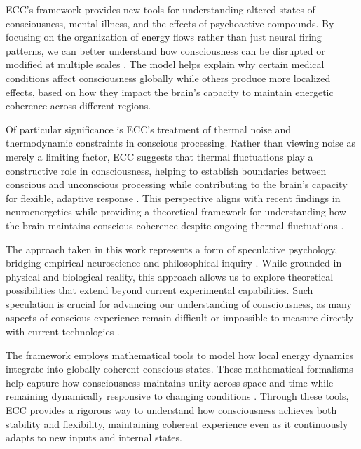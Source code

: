 ECC's framework provides new tools for understanding altered states of consciousness, mental illness, and the effects of psychoactive compounds. By focusing on the organization of energy flows rather than just neural firing patterns, we can better understand how consciousness can be disrupted or modified at multiple scales \cite{varela1991embodied}. The model helps explain why certain medical conditions affect consciousness globally while others produce more localized effects, based on how they impact the brain's capacity to maintain energetic coherence across different regions.

Of particular significance is ECC's treatment of thermal noise and thermodynamic constraints in conscious processing. Rather than viewing noise as merely a limiting factor, ECC suggests that thermal fluctuations play a constructive role in consciousness, helping to establish boundaries between conscious and unconscious processing while contributing to the brain's capacity for flexible, adaptive response \cite{prigogine2018order}. This perspective aligns with recent findings in neuroenergetics while providing a theoretical framework for understanding how the brain maintains conscious coherence despite ongoing thermal fluctuations \cite{Berndt2012}.

The approach taken in this work represents a form of speculative psychology, bridging empirical neuroscience and philosophical inquiry \cite{seth2021being}. While grounded in physical and biological reality, this approach allows us to explore theoretical possibilities that extend beyond current experimental capabilities. Such speculation is crucial for advancing our understanding of consciousness, as many aspects of conscious experience remain difficult or impossible to measure directly with current technologies \cite{block1995confusion}.

The framework employs mathematical tools to model how local energy dynamics integrate into globally coherent conscious states. These mathematical formalisms help capture how consciousness maintains unity across space and time while remaining dynamically responsive to changing conditions \cite{Bredon1997,Arnowitt2008}. Through these tools, ECC provides a rigorous way to understand how consciousness achieves both stability and flexibility, maintaining coherent experience even as it continuously adapts to new inputs and internal states.

